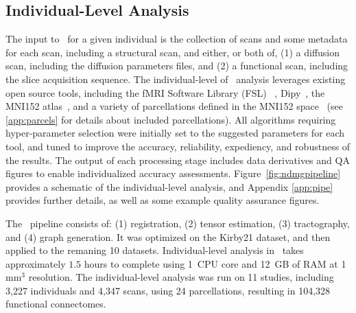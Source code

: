 \documentclass[11pt]{article}
\begin{document}
\subsection{Individual-Level Analysis}

The input to \ndmg~for a given individual is  the collection of scans and some metadata for each scan, including a structural scan, %
and either, or both of, (1) a diffusion scan, including the diffusion parameters files,  and (2) a functional scan, including the slice acquisition sequence.
The individual-level of \ndmg~analysis leverages existing open source tools, including
the fMRI Software Library (FSL) ~\cite{fsl1, fsl2, fsl3}, Dipy~\cite{dipy}, the MNI152 atlas~\cite{mni152}, and a variety of parcellations defined in the MNI152 space~\cite{desikan, aal, jhu, harvardoxford, talairach, slab907, slab1068, pvt, glasser} (see \ref{app:parcels} for details about included parcellations). 
All algorithms requiring hyper-parameter selection were initially set to the suggested parameters for each tool, and tuned to improve the accuracy, reliability, expediency, and robustness of the results.
The output of each processing stage includes data derivatives and QA figures to enable individualized accuracy assessments.
Figure~\ref{fig:ndmgpipeline} provides a schematic of the individual-level analysis, and Appendix  
\ref{app:pipe} provides further details, as well as some example quality assurance figures.

The \ndmgd~pipeline consists of: (1) registration, (2) tensor estimation, (3) tractography, and (4) graph generation. It was optimized on the Kirby21 dataset, and then applied to the remaning 10 datasets.
Individual-level analysis in \ndmgd~takes approximately $1.5$ hours to complete using 1~CPU core and 12~GB of RAM at 1 mm$^3$ resolution.
The individual-level analysis was run on 11 studies, including 3,227 individuals and 4,347 scans, using 24 parcellations,  resulting in 104,328 functional connectomes.
\end{document}
